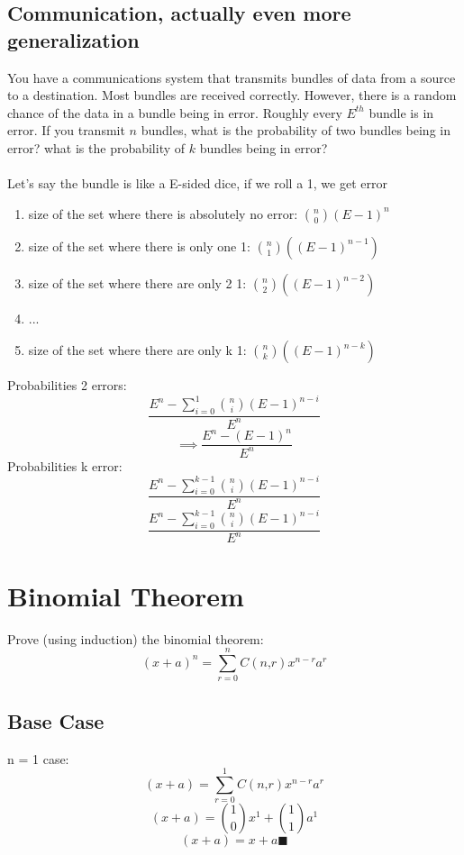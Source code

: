 \documentclass[a4paper,12pt]{article}
\begin{document}
\subsection{Communication, actually even more generalization}
You have a communications system that transmits bundles of data
from a source to a destination.  Most bundles are received correctly.
However, there is a random chance of the data in a bundle being in
error.  Roughly every $E^{th}$ bundle is in error.  If you transmit
$n$ bundles, what is the probability of two bundles being
in error?  what is the probability of $k$ bundles being in
error?\\
\bigskip\\
Let's say the bundle is like a E-sided dice, if we roll a 1, we get error
\begin{enumerate}
  \item{size of the set where there is absolutely no error: $\binom{n}{0}(E-1)^n$}
  \item{size of the set where there is only one 1: $\binom{n}{1}((E-1)^{n-1})$}
  \item{size of the set where there are only 2 1: $\binom{n}{2}((E-1)^{n-2})$} 
  \item{...}
  \item{size of the set where there are only k 1: $\binom{n}{k}((E-1)^{n-k})$} 
\end{enumerate}
Probabilities 2 errors: \\
\[\frac{ E^n - \sum ^1 _{i=0} \binom{n}{i}(E-1)^{n-i}} {E^n}\]
\[\implies \frac{ E^n - (E-1)^{n}}{E^n}\]
Probabilities k error: \\
\[\frac{ E^n - \sum ^{k-1} _{i=0} \binom{n}{i}(E-1)^{n-i}} {E^n}\]
\[\frac{ E^n - \sum ^{k-1} _{i=0} \binom{n}{i}(E-1)^{n-i}} {E^n}\]
\pagebreak
\section{Binomial Theorem}
Prove (using induction) the binomial theorem:
\[
(x+a)^n = \sum_{r=0}^n C(n‚ r)x^{n-r}a^r
\]
\subsection{Base Case}
n = 1 case:\\
\[(x+a) = \sum_{r=0}^1 C(n‚ r)x^{n-r}a^r\]
\[(x+a) = \binom{1}{0} x^{1} + \binom{1}{1}  a^1\]
\[(x+a) = x+a \blacksquare \]
\end{document}
